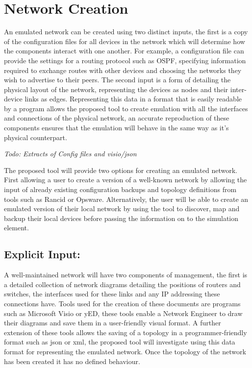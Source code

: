 \documentclass[11pt]{report}
\begin{document}
\section{Network Creation}

An emulated network can be created using two distinct inputs, the first is a copy of the configuration files for all devices in the network which will determine how the components interact with one another. For example, a configuration file can provide the settings for a routing protocol such as OSPF, specifying information required to exchange routes with other devices and choosing the networks they wish to advertise to their peers. The second input is a form of detailing the physical layout of the network, representing the devices as nodes and their inter-device links as edges. Representing this data in a format that is easily readable by a program allows the proposed tool to create emulation with all the interfaces and connections of the physical network, an accurate reproduction of these components ensures that the emulation will behave in the same way as it's physical counterpart.

\textit{Todo: Extracts of Config files and visio/json}

The proposed tool will provide two options for creating an emulated network. First allowing a user to create a version of a well-known network by allowing the input of already existing configuration backups and topology definitions from tools such as Rancid or Opsware. Alternatively, the user will be able to create an emulated version of their local network by using the tool to discover, map and backup their local devices before passing the information on to the simulation element.

\subsection{Explicit Input:}

A well-maintained network will have two components of management, the first is a detailed collection of network diagrams detailing the positions of routers and switches, the interfaces used for these links and any IP addressing these connections have. Tools used for the creation of these documents are programs such as Microsoft Visio or yED, these tools enable a Network Engineer to draw their diagrams and save them in a user-friendly visual format. A further extension of these tools allows the saving of a topology in a programmer-friendly format such as json or xml, the proposed tool will investigate using this data format for representing the emulated network. Once the topology of the network has been created it has no defined behaviour.
\end{document}
